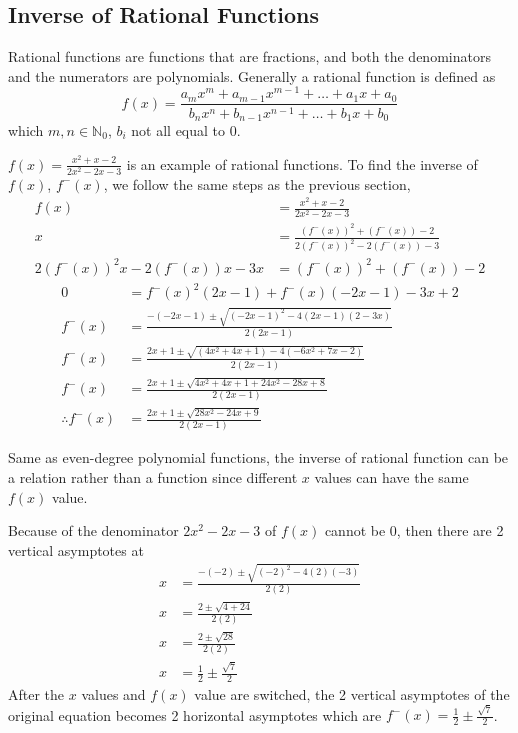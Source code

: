 \documentclass[12pt, titlepage]{article}
\begin{document}
    \subsection{Inverse of Rational Functions}
    Rational functions are functions that are fractions, and both the denominators and the numerators are polynomials. Generally a rational function is defined as
    \begin{equation}
        f(x)=\frac{a_mx^m+a_{m-1}x^{m-1}+\ldots+a_1x+a_0}{b_nx^n+b_{n-1}x^{n-1}+\ldots+b_1x+b_0}
    \end{equation}
    which $m,n\in\mathbb{N}_0$, $b_i$ not all equal to 0. 

    $f(x)=\frac{x^2+x-2}{2x^2-2x-3}$ is an example of rational functions. To find the inverse of $f(x)$, $f^-(x)$, we follow the same steps as the previous section,
    \begin{align}
        f(x)&=\frac{x^2+x-2}{2x^2-2x-3}\\
        x&=\frac{(f^-(x))^2+(f^-(x))-2}{2(f^-(x))^2-2(f^-(x))-3}\\
        2(f^-(x))^2x-2(f^-(x))x-3x&=(f^-(x))^2+(f^-(x))-2
    \end{align}
    \begin{align}
        0&=f^-(x)^2(2x-1)+f^-(x)(-2x-1)-3x+2\\
        f^-(x)&=\frac{-(-2x-1)\pm\sqrt{(-2x-1)^2-4(2x-1)(2-3x)}}{2(2x-1)}\\
        f^-(x)&=\frac{2x+1\pm\sqrt{(4x^2+4x+1)-4(-6x^2+7x-2)}}{2(2x-1)}\\
        f^-(x)&=\frac{2x+1\pm\sqrt{4x^2+4x+1+24x^2-28x+8}}{2(2x-1)}\\
        \therefore f^-(x)&=\frac{2x+1\pm\sqrt{28x^2-24x+9}}{2(2x-1)}
    \end{align}
    
    Same as even-degree polynomial functions, the inverse of rational function can be a relation rather than a function since different $x$ values can have the same $f(x)$ value. 
    
    Because of the denominator $2x^2-2x-3$ of $f(x)$ cannot be 0, then there are 2 vertical asymptotes at
    \begin{align}
        x&=\frac{-(-2)\pm \sqrt{(-2)^2-4(2)(-3)}}{2(2)}\\
        x&=\frac{2\pm \sqrt{4+24}}{2(2)}\\
        x&=\frac{2\pm \sqrt{28}}{2(2)}\\
        x&=\frac{1}{2}\pm\frac{\sqrt{7}}{2}
    \end{align}
    After the $x$ values and $f(x)$ value are switched, the 2 vertical asymptotes of the original equation becomes 2 horizontal asymptotes which are $f^-(x) = \frac{1}{2}\pm\frac{\sqrt{7}}{2}$.
    
\end{document}
